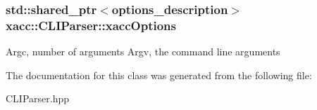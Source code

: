 \subsubsection[{\texorpdfstring{xacc\+Options}{xaccOptions}}]{\setlength{\rightskip}{0pt plus 5cm}std\+::shared\+\_\+ptr$<$options\+\_\+description$>$ xacc\+::\+C\+L\+I\+Parser\+::xacc\+Options\hspace{0.3cm}{\ttfamily [protected]}}\hypertarget{a00021_a0f1564966cc40c340027aecb386c4469}{}\label{a00021_a0f1564966cc40c340027aecb386c4469}
Argc, number of arguments Argv, the command line arguments 

The documentation for this class was generated from the following file\+:\begin{DoxyCompactItemize}
\item 
C\+L\+I\+Parser.\+hpp\end{DoxyCompactItemize}
